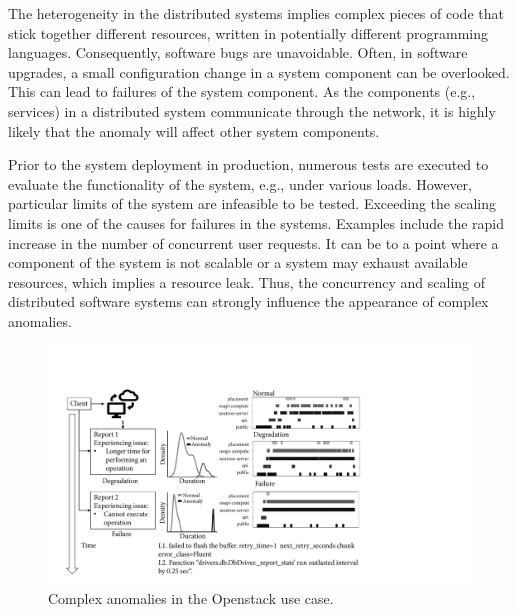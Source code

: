 The heterogeneity in the distributed systems implies complex pieces of code that stick together different resources, written in potentially different programming languages. Consequently, software bugs are unavoidable. Often, in software upgrades, a small configuration change in a system component can be overlooked. This can lead to failures of the system component. As the components (e.g., services) in a distributed system communicate through the network, it is highly likely that the anomaly will affect other system components. 

Prior to the system deployment in production, numerous tests are executed to evaluate the functionality of the system, e.g., under various loads. However, particular limits of the system are infeasible to be tested. Exceeding the scaling limits is one of the causes for failures in the systems. Examples include the rapid increase in the number of concurrent user requests. It can be to a point where a component of the system is not scalable or a system may exhaust available resources, which
implies a resource leak. Thus, the concurrency and scaling of distributed software systems can strongly influence the appearance of complex anomalies.

\begin{figure}[!t]
\centerline{\includegraphics[width=1.0\textwidth]{gfx/chap7/complexanomalies.pdf}}
\caption{Complex anomalies in the Openstack use case.}
\label{fig:complexanomalies}
\end{figure}

